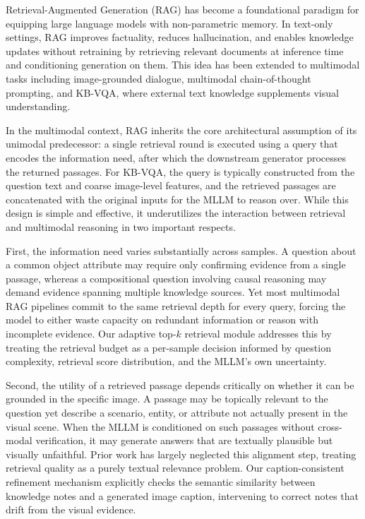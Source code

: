 \documentclass[manuscript,screen,review]{acmart}
\begin{document}
Retrieval-Augmented Generation (RAG) has become a foundational paradigm for equipping large language models with non-parametric memory. In text-only settings, RAG improves factuality, reduces hallucination, and enables knowledge updates without retraining by retrieving relevant documents at inference time and conditioning generation on them. This idea has been extended to multimodal tasks including image-grounded dialogue, multimodal chain-of-thought prompting, and KB-VQA, where external text knowledge supplements visual understanding.

In the multimodal context, RAG inherits the core architectural assumption of its unimodal predecessor: a single retrieval round is executed using a query that encodes the information need, after which the downstream generator processes the returned passages. For KB-VQA, the query is typically constructed from the question text and coarse image-level features, and the retrieved passages are concatenated with the original inputs for the MLLM to reason over. While this design is simple and effective, it underutilizes the interaction between retrieval and multimodal reasoning in two important respects.

First, the information need varies substantially across samples. A question about a common object attribute may require only confirming evidence from a single passage, whereas a compositional question involving causal reasoning may demand evidence spanning multiple knowledge sources. Yet most multimodal RAG pipelines commit to the same retrieval depth for every query, forcing the model to either waste capacity on redundant information or reason with incomplete evidence. Our adaptive top-$k$ retrieval module addresses this by treating the retrieval budget as a per-sample decision informed by question complexity, retrieval score distribution, and the MLLM's own uncertainty.

Second, the utility of a retrieved passage depends critically on whether it can be grounded in the specific image. A passage may be topically relevant to the question yet describe a scenario, entity, or attribute not actually present in the visual scene. When the MLLM is conditioned on such passages without cross-modal verification, it may generate answers that are textually plausible but visually unfaithful. Prior work has largely neglected this alignment step, treating retrieval quality as a purely textual relevance problem. Our caption-consistent refinement mechanism explicitly checks the semantic similarity between knowledge notes and a generated image caption, intervening to correct notes that drift from the visual evidence.
\end{document}
